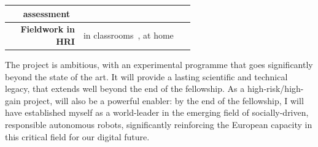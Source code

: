 \begin{table}[h]
\begin{tabular}{rp{0.6\linewidth}}
        assessment~\cite{lemaignan2018underworlds,sallami2019simulation} \\
        \midrule
        \textbf{Fieldwork in HRI} & \small in
        classrooms~\cite{hood2015when, lemaignan2016learning, jacq2016building,
        baxter2015wider,kennedy2016cautious,senft2018robots}, at home~\cite{mondada2015ranger}\\
        \bottomrule
    \end{tabular}
    \label{pi-expertise}
\end{table}

The project is ambitious, with an experimental programme that goes significantly
beyond the state of the art. It will provide a lasting scientific and
technical legacy, that extends well beyond the end of the fellowship. As a
high-risk/high-gain project, \project will also be a powerful enabler: by the
end of the fellowship, I will have established myself as a world-leader in the
emerging field of socially-driven, responsible autonomous robots, significantly
reinforcing the European capacity in this critical field for our digital future.



\newpage





%





